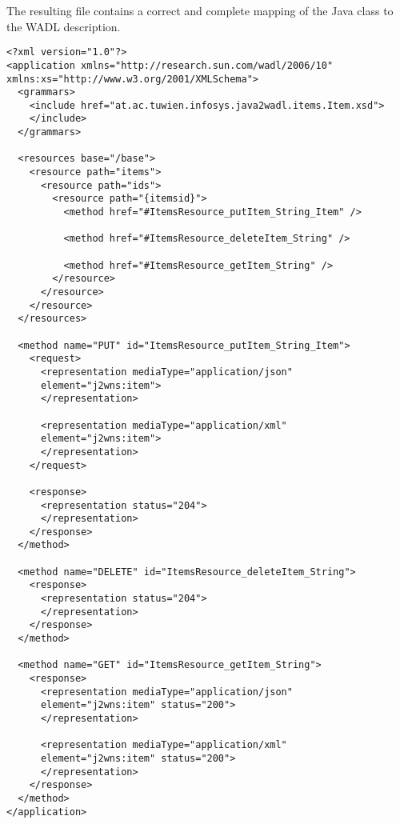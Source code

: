 The resulting file contains a correct and complete mapping of the Java class to the WADL description.
\begin{lstlisting}
<?xml version="1.0"?>
<application xmlns="http://research.sun.com/wadl/2006/10"
xmlns:xs="http://www.w3.org/2001/XMLSchema">
  <grammars>
    <include href="at.ac.tuwien.infosys.java2wadl.items.Item.xsd">
    </include>
  </grammars>

  <resources base="/base">
    <resource path="items">
      <resource path="ids">
        <resource path="{itemsid}">
          <method href="#ItemsResource_putItem_String_Item" />

          <method href="#ItemsResource_deleteItem_String" />

          <method href="#ItemsResource_getItem_String" />
        </resource>
      </resource>
    </resource>
  </resources>

  <method name="PUT" id="ItemsResource_putItem_String_Item">
    <request>
      <representation mediaType="application/json"
      element="j2wns:item">
      </representation>

      <representation mediaType="application/xml"
      element="j2wns:item">
      </representation>
    </request>

    <response>
      <representation status="204">
      </representation>
    </response>
  </method>

  <method name="DELETE" id="ItemsResource_deleteItem_String">
    <response>
      <representation status="204">
      </representation>
    </response>
  </method>

  <method name="GET" id="ItemsResource_getItem_String">
    <response>
      <representation mediaType="application/json"
      element="j2wns:item" status="200">
      </representation>

      <representation mediaType="application/xml"
      element="j2wns:item" status="200">
      </representation>
    </response>
  </method>
</application>
\end{lstlisting}
